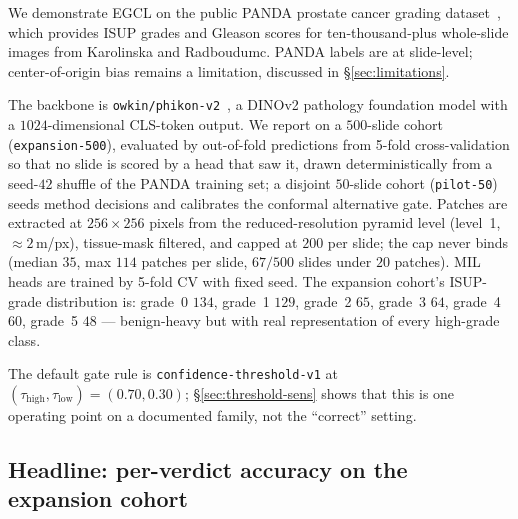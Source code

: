 \documentclass{article}
\newcommand{\SafeNum}[1]{#1}
\begin{document}
We demonstrate EGCL on the public PANDA prostate cancer grading dataset~\citep{bulten2020panda,bulten2022artificial}, which provides ISUP grades and Gleason scores for ten-thousand-plus whole-slide images from Karolinska and Radboudumc. PANDA labels are at slide-level; center-of-origin bias remains a limitation, discussed in \S\ref{sec:limitations}.

The backbone is \texttt{owkin/phikon-v2}~\citep{filiot2024phikonv2}, a DINOv2 pathology foundation model with a $1024$-dimensional CLS-token output. We report on a $\SafeNum{500}$-slide cohort (\texttt{expansion-500}), evaluated by out-of-fold predictions from 5-fold cross-validation so that no slide is scored by a head that saw it, drawn deterministically from a seed-$\SafeNum{42}$ shuffle of the PANDA training set; a disjoint $\SafeNum{50}$-slide cohort (\texttt{pilot-50}) seeds method decisions and calibrates the conformal alternative gate. Patches are extracted at $\SafeNum{256}{\times}\SafeNum{256}$ pixels from the reduced-resolution pyramid level (level~1, $\approx\SafeNum{2}$\,\textmu m/px), tissue-mask filtered, and capped at $\SafeNum{200}$ per slide; the cap never binds (median $\SafeNum{35}$, max $\SafeNum{114}$ patches per slide, $\SafeNum{67}/\SafeNum{500}$ slides under $\SafeNum{20}$ patches). MIL heads are trained by 5-fold CV with fixed seed. The expansion cohort's ISUP-grade distribution is: grade~0 $\SafeNum{134}$, grade~1 $\SafeNum{129}$, grade~2 $\SafeNum{65}$, grade~3 $\SafeNum{64}$, grade~4 $\SafeNum{60}$, grade~5 $\SafeNum{48}$ --- benign-heavy but with real representation of every high-grade class.

The default gate rule is \texttt{confidence-threshold-v1} at $(\tau_{\text{high}}, \tau_{\text{low}}) = (\SafeNum{0.70}, \SafeNum{0.30})$; \S\ref{sec:threshold-sens} shows that this is one operating point on a documented family, not the ``correct'' setting.

\subsection{Headline: per-verdict accuracy on the expansion cohort}
\label{sec:headline}
\end{document}
